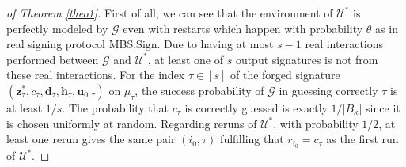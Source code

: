 \documentclass[conference]{IEEEtran}
\newtheorem{proof}{Proof}
\begin{document}
\begin{proof}[of Theorem \ref{theo1}]
		
		First of all, we can see that the environment of $\mathcal{U}^*$ is perfectly modeled by $\mathcal{G}$ even with restarts which happen with probability $\theta$ as in real signing protocol \textsf{MBS.Sign}.  Due to having at most $s-1$ real interactions performed between $\mathcal{G}$ and $\mathcal{U}^*$, at least one  of $s$ output signatures is not from these real interactions. For the index $\tau \in[s]$ of the forged signature $(\mathbf{z}^*_{\tau}, c_\tau, \mathbf{d}_\tau, \mathbf{h}_{\tau}, \mathbf{u}_{0,\tau})$ on $\mu_\tau$, the success probability of $\mathcal{G}$ in guessing correctly $\tau$ is at least $1/s$. The probability that $c_{\tau}$ is correctly guessed is exactly $1/|B_{\kappa}|$ since it is chosen uniformly at random. Regarding reruns of $\mathcal{U}^*$, with probability $1/2$, at least one rerun gives the same pair $(i_0,\tau)$ fulfilling that  $r_{i_0}=c_\tau$ as the first run of $\mathcal{U}^*$. 
		

\end{proof}
\end{document}
